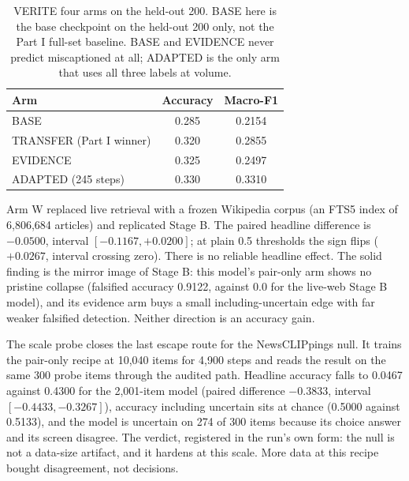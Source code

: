 \documentclass[conference]{IEEEtran}
\begin{document}
\begin{table}[t]
\centering
\caption{VERITE four arms on the held-out 200. BASE here is the base checkpoint on the held-out 200 only, not the Part I full-set baseline. BASE and EVIDENCE never predict miscaptioned at all; ADAPTED is the only arm that uses all three labels at volume.}
\label{tab:verite4}
\begin{tabular}{lcc}
\toprule
Arm & Accuracy & Macro-F1 \\
\midrule
BASE & 0.285 & 0.2154 \\
TRANSFER (Part I winner) & 0.320 & 0.2855 \\
EVIDENCE & 0.325 & 0.2497 \\
ADAPTED (245 steps) & 0.330 & 0.3310 \\
\bottomrule
\end{tabular}
\end{table}

Arm W replaced live retrieval with a frozen Wikipedia corpus (an FTS5 index of 6,806,684 articles) and replicated Stage B. The paired headline difference is $-0.0500$, interval $[-0.1167, +0.0200]$; at plain 0.5 thresholds the sign flips ($+0.0267$, interval crossing zero). There is no reliable headline effect. The solid finding is the mirror image of Stage B: this model's pair-only arm shows no pristine collapse (falsified accuracy 0.9122, against 0.0 for the live-web Stage B model), and its evidence arm buys a small including-uncertain edge with far weaker falsified detection. Neither direction is an accuracy gain.

The scale probe closes the last escape route for the NewsCLIPpings null. It trains the pair-only recipe at 10,040 items for 4,900 steps and reads the result on the same 300 probe items through the audited path. Headline accuracy falls to 0.0467 against 0.4300 for the 2,001-item model (paired difference $-0.3833$, interval $[-0.4433, -0.3267]$), accuracy including uncertain sits at chance (0.5000 against 0.5133), and the model is uncertain on 274 of 300 items because its choice answer and its screen disagree. The verdict, registered in the run's own form: the null is not a data-size artifact, and it hardens at this scale. More data at this recipe bought disagreement, not decisions.
\end{document}
